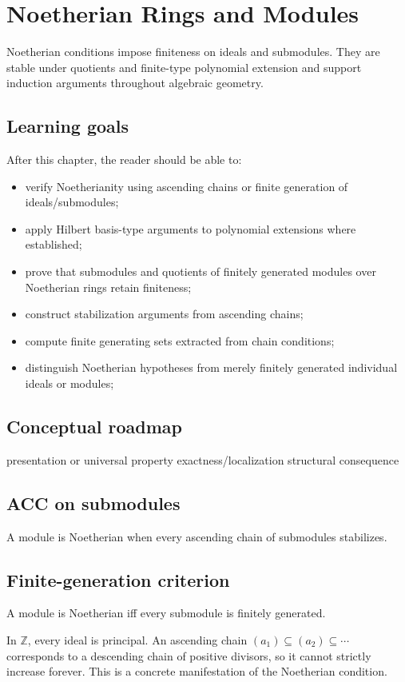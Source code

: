 \chapter{Noetherian Rings and Modules}
\label{ch:v15}

Noetherian conditions impose finiteness on ideals and submodules. They are stable under quotients and finite-type polynomial extension and support induction arguments throughout algebraic geometry.

\section*{Learning goals}
After this chapter, the reader should be able to:
\begin{itemize}
\item verify Noetherianity using ascending chains or finite generation of ideals/submodules;
\item apply Hilbert basis-type arguments to polynomial extensions where established;
\item prove that submodules and quotients of finitely generated modules over Noetherian rings retain finiteness;
\item construct stabilization arguments from ascending chains;
\item compute finite generating sets extracted from chain conditions;
\item distinguish Noetherian hypotheses from merely finitely generated individual ideals or modules;
\end{itemize}
\section*{Conceptual roadmap}
\volroadmap
  {presentation or universal property}
  {exactness/localization}
  {structural consequence}

\section{ACC on submodules}
A module is Noetherian when every ascending chain of submodules stabilizes.

\section{Finite-generation criterion}
A module is Noetherian iff every submodule is finitely generated.

\begin{example}\label{ex:v15-expand-01}
In $\mathbb Z$, every ideal is principal. An ascending chain $(a_1)\subseteq(a_2)\subseteq\cdots$ corresponds to a descending chain of positive divisors, so it cannot strictly increase forever. This is a concrete manifestation of the Noetherian condition.
\end{example}
